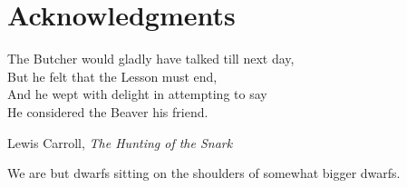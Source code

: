 \cleartorecto %
\chapter{Acknowledgments} %
\thispagestyle{plain} %

\epigraph{The Butcher would gladly have talked till next day,\\
But he felt that the Lesson must end,\\
And he wept with delight in attempting to say\\
He considered the Beaver his friend.}{Lewis Carroll, \textit{The Hunting of the Snark}}

We are but dwarfs sitting on the shoulders of somewhat bigger dwarfs.

